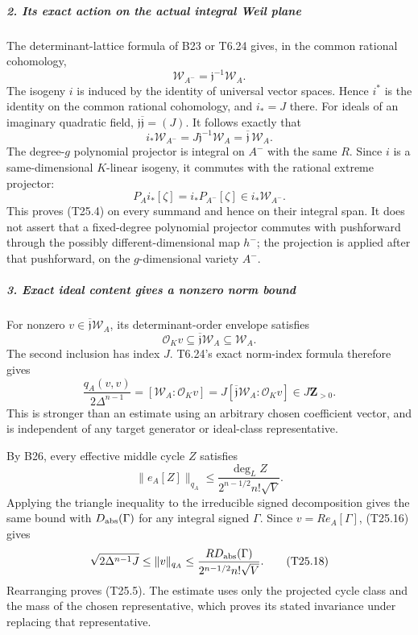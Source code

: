 \subparagraph{2. Its exact action on the actual integral Weil plane}\label{its-exact-action-on-the-actual-integral-weil-plane}

The determinant-lattice formula of B23 or T6.24 gives, in the common rational cohomology, \[
 \mathscr W_{A^-}=\mathfrak j^{-1}\mathscr W_A.
 \tag{T25.12}
\] The isogeny \(i\) is induced by the identity of universal vector spaces. Hence \(i^*\) is the identity on the common rational cohomology, and \(i_*=J\) there. For ideals of an imaginary quadratic field, \(\mathfrak j\overline{\mathfrak j}=(J)\). It follows exactly that \[
 i_*\mathscr W_{A^-}
       =J\mathfrak j^{-1}\mathscr W_A
       =\overline{\mathfrak j}\,\mathscr W_A.
 \tag{T25.13}
\] The degree-\(g\) polynomial projector is integral on \(A^-\) with the same \(R\). Since \(i\) is a same-dimensional \(K\)-linear isogeny, it commutes with the rational extreme projector: \[
 P_A i_*[\zeta]=i_* P_{A^-}[\zeta]
       \in i_*\mathscr W_{A^-}.
 \tag{T25.14}
\] This proves (T25.4) on every summand and hence on their integral span. It does not assert that a fixed-degree polynomial projector commutes with pushforward through the possibly different-dimensional map \(h^-\); the projection is applied after that pushforward, on the \(g\)-dimensional variety \(A^-\).

\subparagraph{3. Exact ideal content gives a nonzero norm bound}\label{exact-ideal-content-gives-a-nonzero-norm-bound}

For nonzero \(v\in\overline{\mathfrak j}\mathscr W_A\), its determinant-order envelope satisfies \[
 \mathcal O_K v\subseteq\overline{\mathfrak j}\mathscr W_A
                         \subseteq\mathscr W_A.
 \tag{T25.15}
\] The second inclusion has index \(J\). T6.24's exact norm-index formula therefore gives \[
 \frac{q_A(v,v)}{2\Delta^{n-1}}
     =[\mathscr W_A:\mathcal O_Kv]
     =J[\overline{\mathfrak j}\mathscr W_A:\mathcal O_Kv]
     \in J\mathbf Z_{>0}.
 \tag{T25.16}
\] This is stronger than an estimate using an arbitrary chosen coefficient vector, and is independent of any target generator or ideal-class representative.

By B26, every effective middle cycle \(Z\) satisfies \[
 \|e_A[Z]\|_{q_A}
    \le\frac{\deg_LZ}{2^{n-1/2}n!\sqrt V}.
 \tag{T25.17}
\] Applying the triangle inequality to the irreducible signed decomposition gives the same bound with \(D_{\rm abs}(\Gamma)\) for any integral signed \(\Gamma\). Since \(v=R e_A[\Gamma]\), (T25.16) gives \[
 \sqrt{2\Delta^{n-1}J}
 \le\|v\|_{q_A}
 \le\frac{R D_{\rm abs}(\Gamma)}
                {2^{n-1/2}n!\sqrt V}.
 \tag{T25.18}
\] Rearranging proves (T25.5). The estimate uses only the projected cycle class and the mass of the chosen representative, which proves its stated invariance under replacing that representative.

